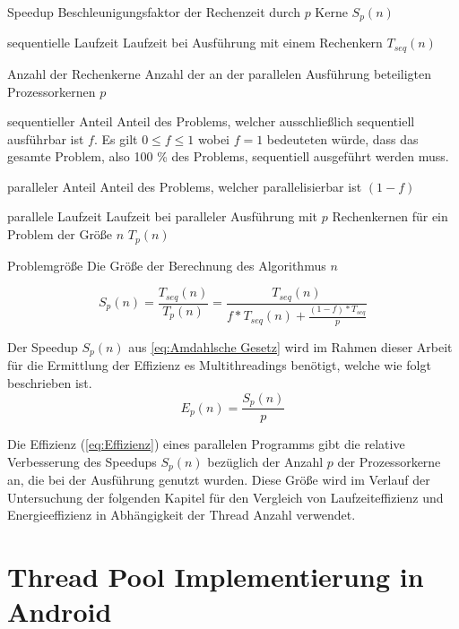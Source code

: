 \begin{aligneddescription}
\item[Speedup] Beschleunigungsfaktor der Rechenzeit durch $p$ Kerne $S_{p}(n)$
\item [sequentielle Laufzeit] Laufzeit bei Ausführung mit einem Rechenkern $T_{seq}(n)$
\item[Anzahl der Rechenkerne] Anzahl der an der parallelen Ausführung beteiligten Prozessorkernen $p$
\item[sequentieller Anteil] Anteil des Problems, welcher ausschließlich sequentiell ausführbar ist $f$. Es gilt $0\leq f \leq 1$ wobei $f = 1$ bedeuteten würde, dass das gesamte Problem, also 100 \% des Problems, sequentiell ausgeführt werden muss.
\item[paralleler Anteil] Anteil des Problems, welcher parallelisierbar ist $(1-f)$
\item[parallele Laufzeit] Laufzeit bei paralleler Ausführung mit $p$ Rechenkernen für ein Problem der Größe $n$ $T_{p}(n)$
\item[Problemgröße] Die Größe der Berechnung des Algorithmus $n$
\end{aligneddescription}
\begin{equation}\label{eq:Amdahlsche Gesetz}
S_{p}(n)=\frac{T_{seq}(n)}{T_{p}(n)} =
\frac{T_{seq}(n)}{f*T_{seq}(n) + \frac{ (1-f)*T_{seq} }{p}}
\end{equation}
\cite[317]{parallelBook}

Der Speedup $S_{ p }(n)$ aus \autoref{eq:Amdahlsche Gesetz} wird im Rahmen dieser Arbeit für die Ermittlung der Effizienz es Multithreadings benötigt, welche wie folgt beschrieben ist. 
\begin{equation}\label{eq:Effizienz}
E_{ p }(n) =\frac{ S_{ p }(n) }{p}
\end{equation}
\cite[316]{parallelBook}

Die Effizienz (\autoref{eq:Effizienz}) eines parallelen Programms gibt die relative Verbesserung des Speedups $S_{ p }(n)$ bezüglich der Anzahl $p$ der Prozessorkerne an, die bei der Ausführung genutzt wurden. Diese Größe wird im Verlauf der Untersuchung der folgenden Kapitel für den Vergleich von Laufzeiteffizienz und Energieeffizienz in Abhängigkeit der Thread Anzahl verwendet.

\section{Thread Pool Implementierung in Android}

